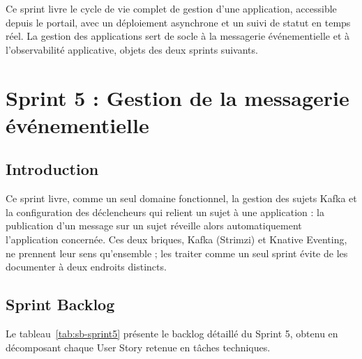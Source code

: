 Ce sprint livre le cycle de vie complet de gestion d'une application, accessible depuis le portail, avec un déploiement asynchrone et un suivi de statut en temps réel. La gestion des applications sert de socle à la messagerie événementielle et à l'observabilité applicative, objets des deux sprints suivants.

\clearpage
\section{Sprint 5 : Gestion de la messagerie événementielle}

\subsection{Introduction}

Ce sprint livre, comme un seul domaine fonctionnel, la gestion des sujets Kafka et la configuration des déclencheurs qui relient un sujet à une application : la publication d'un message sur un sujet réveille alors automatiquement l'application concernée. Ces deux briques, Kafka (Strimzi) et Knative Eventing, ne prennent leur sens qu'ensemble ; les traiter comme un seul sprint évite de les documenter à deux endroits distincts.
\subsection{Sprint Backlog}
Le tableau~\ref{tab:sb-sprint5} présente le backlog détaillé du Sprint 5, obtenu en décomposant chaque User Story retenue en tâches techniques.

